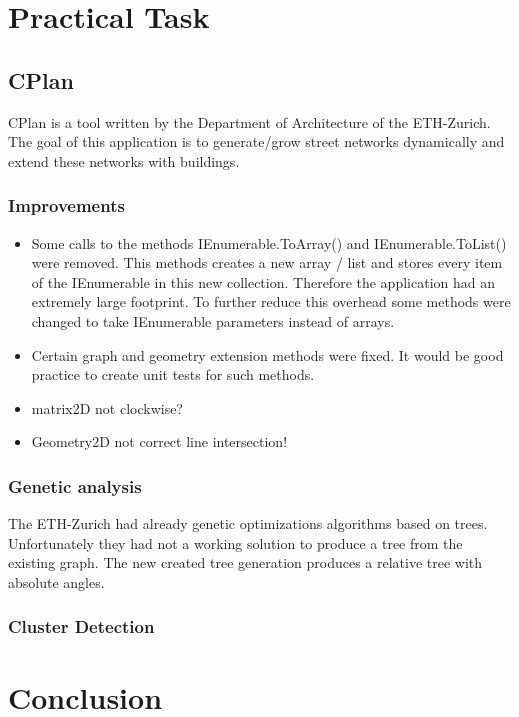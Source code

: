 \documentclass[11pt, a4paper]{report}
\begin{document}
\pagebreak
\chapter{Practical Task}
\section{CPlan}\label{CPlan}
CPlan is a tool written by the Department of Architecture of the ETH-Zurich. The goal of this application is to generate/grow street networks dynamically and extend these networks with buildings. 
\subsection{Improvements}
\begin{itemize}
    \item Some calls to the methods IEnumerable.ToArray() and IEnumerable.ToList() were removed. This methods creates a new array / list and stores every item of the IEnumerable in this new collection. Therefore the application had an extremely large footprint. To further reduce this overhead some methods were changed to take IEnumerable parameters instead of arrays.
    \item Certain graph and geometry extension methods were fixed. It would be good practice to create unit tests for such methods.
    \item matrix2D not clockwise?
    \item Geometry2D not correct line intersection!
\end{itemize}

\subsection{Genetic analysis}
The ETH-Zurich had already genetic optimizations algorithms based on trees. Unfortunately they had not a working solution to produce a tree from the existing graph. The new created tree generation produces a relative tree with absolute angles.

\subsection{Cluster Detection}

\chapter{Conclusion}


\appendix
\glsaddall
\printglossaries
\end{document}
